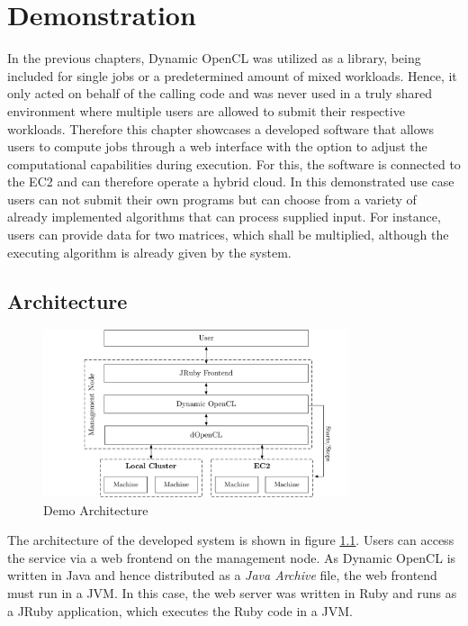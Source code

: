 \chapter{Demonstration}
\label{demonstration}
In the previous chapters, Dynamic OpenCL was utilized as a library, being included for single jobs or a predetermined amount of mixed workloads. Hence, it only acted on behalf of the calling code and was never used in a truly shared environment where multiple users are allowed to submit their respective workloads. Therefore this chapter showcases a developed software that allows users to compute jobs through a web interface with the option to adjust the computational capabilities during execution. For this, the software is connected to the EC2 and can therefore operate a hybrid cloud. In this demonstrated use case users can not submit their own programs but can choose from a variety of already implemented algorithms that can process supplied input. For instance, users can provide data for two matrices, which shall be multiplied, although the executing algorithm is already given by the system.

\section{Architecture}

\begin{figure}[!htb]
	\includegraphics[width=0.8\textwidth]{drawings/demo_architecture.pdf}
	\centering
	\caption{Demo Architecture}
	\label{img:demo_architecture}
\end{figure}
The architecture of the developed system is shown in figure \ref{img:demo_architecture}. Users can access the service via a web frontend on the management node. As Dynamic OpenCL is written in Java and hence distributed as a \textit{Java Archive} file, the web frontend must run in a JVM. In this case, the web server was written in Ruby and runs as a JRuby application, which executes the Ruby code in a JVM.

